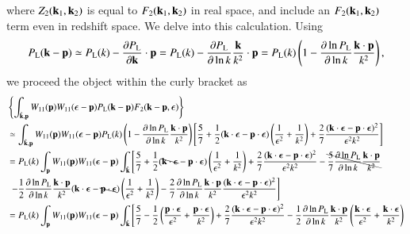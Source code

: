 \documentclass[onecolumn,showpacs,amsmath,amssymb,prd,floatfix,preprintnumbers]{revtex4}
\newcommand{\bk}{{\bf k}}
\newcommand{\bp}{{\bf p}}
\begin{document}
where $Z_2(\bk_1,\bk_2)$ is equal to $F_2(\bk_1,\bk_2)$ in real space, and include an $F_2(\bk_1,\bk_2)$ term even in redshift space.
We delve into this calculation. Using
\begin{align}
  P_{\rm L}(\bk-\bp) \simeq P_{\rm L}(k) - \frac{\partial P_{\rm L}}{\partial \bk} \cdot \bp 
  = P_{\rm L}(k) - \frac{\partial P_{\rm L}}{\partial \ln k} \frac{\bk}{k^2} \cdot \bp = P_{\rm L}(k) \left( 1- \frac{\partial \ln P_{\rm L}}{\partial \ln k} \frac{\bk \cdot \bp}{k^2} \right),
\end{align}
we proceed the object within the curly bracket as
\begin{align}
  &\left\{ \int_{\hat{\bk},\bp} W_{11}(\bp) W_{11}({\boldsymbol \epsilon}-\bp) P_{\rm L}(\bk-\bp) F_2(\bk-\bp, {\boldsymbol \epsilon}) \right\} \nonumber \\
  &\simeq \int_{\hat{\bk},\bp} W_{11}(\bp) W_{11}({\boldsymbol \epsilon}-\bp) P_{\rm L}(k) \left( 1- \frac{\partial \ln P_{\rm L}}{\partial \ln k} \frac{\bk \cdot \bp}{k^2} \right) \left[\frac{5}{7} + \frac{1}{2} (\bk\cdot{\boldsymbol \epsilon} - \bp\cdot{\boldsymbol \epsilon}) \left( \frac{1}{\epsilon^2} + \frac{1}{k^2} \right) + \frac{2}{7} \frac{(\bk\cdot{\boldsymbol \epsilon} - \bp\cdot{\boldsymbol \epsilon})^2}{\epsilon^2 k^2} \right] \nonumber \\
  &= P_{\rm L}(k) \int_\bp W_{11}(\bp) W_{11}({\boldsymbol \epsilon}-\bp) \int_{\hat{\bk}} \left[ \frac{5}{7} + \frac{1}{2} (\bcancel{\bk\cdot{\boldsymbol \epsilon}} - \bp\cdot{\boldsymbol \epsilon}) \left( \frac{1}{\epsilon^2} + \frac{1}{k^2} \right) + \frac{2}{7} \frac{(\bk\cdot{\boldsymbol \epsilon} - \bp\cdot{\boldsymbol \epsilon})^2}{\epsilon^2 k^2} - \bcancel{\frac{5}{7} \frac{\partial \ln P_{\rm L}}{\partial \ln k} \frac{\bk \cdot \bp}{k^2}} \right. \nonumber \\
  &~\left. - \frac{1}{2} \frac{\partial \ln P_{\rm L}}{\partial \ln k} \frac{\bk \cdot \bp}{k^2} (\bk\cdot{\boldsymbol \epsilon} - \bcancel{\bp\cdot{\boldsymbol \epsilon}}) \left( \frac{1}{\epsilon^2} + \frac{1}{k^2} \right) - \frac{2}{7} \frac{\partial \ln P_{\rm L}}{\partial \ln k} \frac{\bk \cdot \bp}{k^2} \frac{(\bk\cdot{\boldsymbol \epsilon} - \bp\cdot{\boldsymbol \epsilon})^2}{\epsilon^2 k^2} \right] \nonumber \\
  &= P_{\rm L}(k) \int_\bp W_{11}(\bp) W_{11}({\boldsymbol \epsilon}-\bp) \int_{\hat{\bk}} \left[ \frac{5}{7} - \frac{1}{2} \left( \frac{\bp\cdot{\boldsymbol \epsilon}}{\epsilon^2} + \frac{\bp\cdot{\boldsymbol \epsilon}}{k^2} \right) + \frac{2}{7} \frac{(\bk\cdot{\boldsymbol \epsilon} - \bp\cdot{\boldsymbol \epsilon})^2}{\epsilon^2 k^2} - \frac{1}{2} \frac{\partial \ln P_{\rm L}}{\partial \ln k} \frac{\bk \cdot \bp}{k^2}  \left( \frac{\bk\cdot{\boldsymbol \epsilon}}{\epsilon^2} + \frac{\bk\cdot{\boldsymbol \epsilon}}{k^2} \right) \right. \nonumber \\

\end{align}
\end{document}
